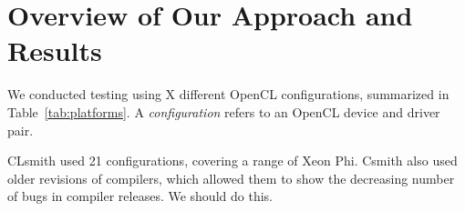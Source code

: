 \section{Overview of Our Approach and Results}\label{sec:overview}

We conducted testing using X different OpenCL configurations, summarized in Table~\ref{tab:platforms}. A \emph{configuration} refers to an OpenCL device and driver pair.



CLsmith used 21 configurations, covering a range of Xeon Phi. Csmith also used older revisions of compilers, which allowed them to show the decreasing number of bugs in compiler releases. We should do this.